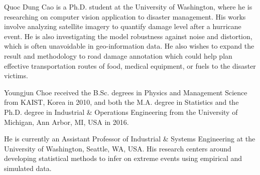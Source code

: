 \documentclass[journal, 12pt, onecolumn,draftclsnofoot]{IEEEtran}
\begin{document}
\ifCLASSOPTIONcaptionsoff
  \newpage
\fi











\begin{IEEEbiography}{Quoc Dung Cao}
is a Ph.D. student at the University of Washington, where he is researching on
computer vision application to disaster management. His works involve analyzing satellite imagery to quantify damage level after a hurricane event. He is also investigating the model robustness against noise and distortion, which is often unavoidable in geo-information data. He also wishes to expand the result and methodology to road damage annotation which could help plan effective transportation routes of food, medical equipment, or fuels to the disaster victims.
\end{IEEEbiography}

\begin{IEEEbiography}{Youngjun Choe}
received the B.Sc. degrees in Physics and Management Science from KAIST, Korea in 2010, and both the M.A. degree in Statistics and the Ph.D. degree in Industrial \& Operations Engineering from the University of Michigan, Ann Arbor, MI, USA in 2016. 

He is currently an Assistant Professor of Industrial \& Systems Engineering at the University of Washington, Seattle, WA, USA. His research centers around developing statistical methods to infer on extreme events using empirical and simulated data. 
\end{IEEEbiography}
\end{document}
